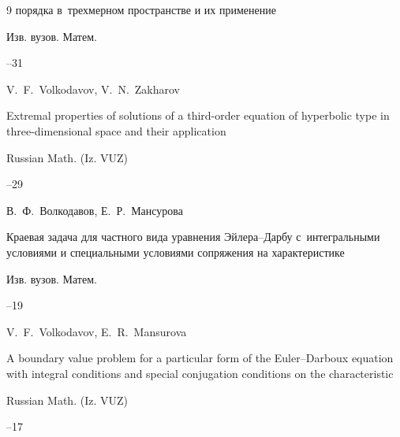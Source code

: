 \begin{thebibliography}{9}
порядка в~трехмерном пространстве и их применение

\jour Изв. вузов. Матем.



--31




\transl

\by V.~F.~Volkodavov, V.~N.~Zakharov

\paper Extremal properties of solutions of a third-order equation of hyperbolic type in three-dimensional space and their application

\jour Russian Math. (Iz. VUZ)




--29




\by В.~Ф.~Волкодавов, Е.~Р.~Мансурова

\paper Краевая задача для частного вида уравнения Эйлера--Дарбу с~интегральными условиями и специальными условиями сопряжения на характеристике

\jour Изв. вузов. Матем.



--19




\transl

\by V.~F.~Volkodavov,  E.~R.~Mansurova 

\paper A boundary value problem for a particular form of the Euler--Darboux equation with integral conditions and special conjugation conditions on the characteristic

\jour Russian Math. (Iz. VUZ)




--17




\end{thebibliography}
